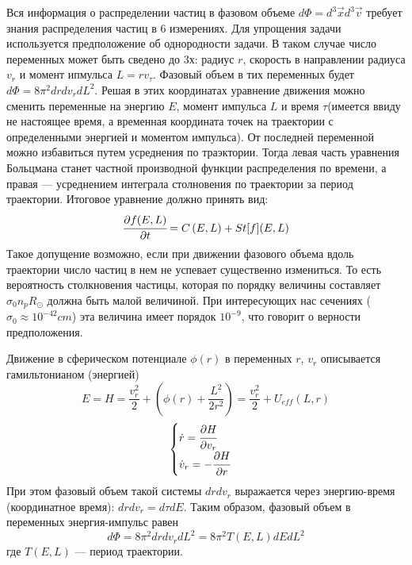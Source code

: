 Вся информация о распределении частиц в фазовом объеме $d\Phi = d^{3}\vec{x}d^{3}\vec{v}$
требует знания распределения частиц в 6 измерениях. Для упрощения задачи используется
предположение об однородности задачи. В таком случае число переменных может быть сведено 
до 3х: радиус $r$, скорость в направлении радиуса $v_r$ и момент ипмульса $L = r v_{\tau}$.
Фазовый объем в тих переменных будет $d\Phi = 8\pi^{2}drdv_{r}dL^{2}$. Решая в этих
координатах уравнение движения можно сменить переменные на энергию $E$, момент 
импульса $L$ и время $\tau$(имеется ввиду не настоящее время, а временная координата точек на траектории с определенными энергией и моментом импульса). От последней переменной можно
избавиться путем усреднения по траэктории. Тогда левая часть уравнения Больцмана станет
частной производной функции распределения по времени, а правая --- усреднением интеграла столновения по траектории за период траектории. Итоговое уравнение должно принять вид:
\begin{equation}
	\label{eq:boltsman_EL}
	\cfrac{\partial f(E,L)}{\partial t} = C\left( {E,L} \right) + St\lbrack f\rbrack(E,L)
\end{equation}
Такое допущение возможно, если при движении фазового объема вдоль траектории число 
частиц в нем не успевает существенно измениться. То есть вероятность столкновения частицы,
которая по порядку величины составляет $\sigma_0 n_p R_{\odot}$ должна быть малой величиной. При интересующих нас сечениях ($\sigma_0 \approx 10^{-42} cm$) эта величина 
имеет порядок $10^{-9}$, что говорит о верности предположения.

Движение в сферическом потенциале $\phi(r)$ в переменных $r$, $v_r$ описывается гамильтонианом (энергией)
\begin{equation}
	\label{eq:move_hamiltonian}	
	E = H = \frac{v_{r}^{2}}{2} + \left( {\phi(r) + \frac{L^{2}}{2r^{2}}} \right) = \frac{v_{r}^{2}}{2} + U_{eff}(L,r)
\end{equation}
\begin{equation}
	\label{eq:move_equations}
	\begin{cases}
		\dot{r} = \cfrac{\partial H}{\partial v_r}\\
		\dot{v}_r= -\cfrac{\partial H}{\partial r}
	\end{cases}
\end{equation}
При этом фазовый объем такой системы $drdv_r$ выражается через энергию-время (координатное время): $drdv_r = d\tau dE$. Таким образом, фазовый объем в переменных энергия-импульс равен
\begin{equation}
	\label{eq:phase_volume_EL}
	d\Phi = 8\pi^{2}drdv_{r}dL^{2} = 8\pi^{2}T(E,L)dEdL^2
\end{equation}
где $T(E,L)$ --- период траектории.

